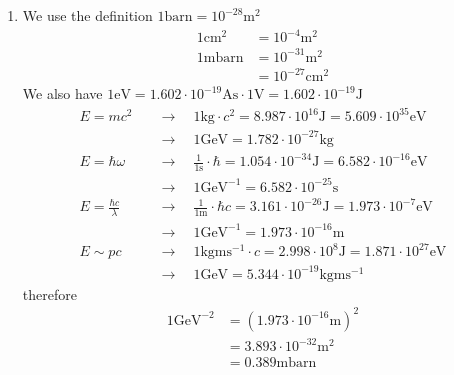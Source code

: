 \documentclass[10pt,a4paper]{article}
\theoremstyle{definition}
\begin{document}
\begin{enumerate}
\item We use the definition $1\text{barn}=10^{-28}\text{m}^2$
\begin{align}
    1\text{cm}^2  &= 10^{-4}\text{m}^2\\
    1\text{mbarn} &= 10^{-31}\text{m}^2\\
                  &= 10^{-27}\text{cm}^2
\end{align}
We also have $1\text{eV} =1.602\cdot10^{-19}\text{As}\cdot1\text{V}=1.602\cdot10^{-19}\text{J}$
\begin{align}
    E=mc^2\quad
    &\rightarrow\quad 1\text{kg}\cdot c^2 = 8.987\cdot10^{16}\text{J}=5.609\cdot10^{35}\text{eV}\\
    &\rightarrow\quad 1\text{GeV} = 1.782\cdot10^{-27}\text{kg}\\
    E=\hbar\omega\quad
    &\rightarrow\quad \frac{1}{1\text{s}}\cdot \hbar = 1.054\cdot10^{-34}\text{J}=6.582\cdot10^{-16}\text{eV}\\
    &\rightarrow\quad 1\text{GeV}^{-1} = 6.582\cdot10^{-25}\text{s}\\
    E= \frac{\hbar c}{\lambda}\quad
    &\rightarrow\quad \frac{1}{1\text{m}}\cdot \hbar c = 3.161\cdot10^{-26}\text{J}=1.973\cdot10^{-7}\text{eV}\\
    &\rightarrow\quad 1\text{GeV}^{-1} = 1.973\cdot10^{-16}\text{m}\\
    E\sim pc\quad
    &\rightarrow\quad 1\text{kg}\text{m}\text{s}^{-1}\cdot c= 2.998\cdot10^{8}\text{J}=1.871\cdot10^{27}\text{eV}\\
    &\rightarrow\quad 1\text{GeV} = 5.344\cdot10^{-19}\text{kg}\text{m}\text{s}^{-1}
\end{align}
therefore
\begin{align}
    1\text{GeV}^{-2} &= (1.973\cdot10^{-16}\text{m})^2\\
    &=3.893\cdot10^{-32}\text{m}^2\\
    &=0.389\text{mbarn}
\end{align}
\end{enumerate}
\end{document}
